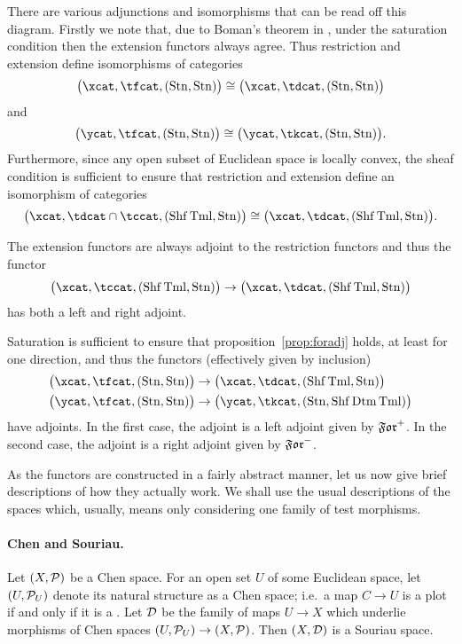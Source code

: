 \documentclass[%
12pt,%
arxiv,%
defaults
]{myclass}
\begin{document}
There are various adjunctions and isomorphisms that can be read off this diagram.
Firstly we note that, due to Boman's theorem in \cite{jb3}, under the saturation condition then the extension functors always agree.
Thus restriction and extension define isomorphisms of categories
%
\[
  \big(\xcat, \tfcat, (\Sat, \Sat)\big) \cong \big(\xcat, \tdcat,(\Sat,\Sat)\big)
\]
%
and
%
\[
  \big(\ycat, \tfcat, (\Sat, \Sat)\big) \cong \big(\ycat, \tkcat, (\Sat,\Sat)\big).
\]
%
Furthermore, since any open subset of Euclidean space is locally convex, the sheaf condition is sufficient to ensure that restriction and extension define an isomorphism of categories
%
\[
  \big(\xcat, \tdcat \cap \tccat, (\Sheaf \Term,\Sat)\big) \cong      \big(\xcat, \tdcat, (\Sheaf \Term,\Sat)\big).
\]

The extension functors are always adjoint to the restriction functors and thus the functor
%
\[
  \big(\xcat, \tccat, (\Sheaf \Term,\Sat)\big) \to \big(\xcat, \tdcat, (\Sheaf \Term,\Sat)\big)
\]
%
has both a left and right adjoint.

Saturation is sufficient to ensure that proposition~\ref{prop:foradj} holds, at least for one direction, and thus the functors (effectively given by inclusion)
%
\begin{align*}
  \big(\xcat, \tfcat, (\Sat, \Sat)\big) &\to \big(\xcat, \tdcat, (\Sheaf\Term, \Sat)\big) \\
%
  \big(\ycat, \tfcat, (\Sat, \Sat)\big) &\to \big(\ycat, \tkcat, (\Sat,\Sheaf\Detm\Term)\big)
\end{align*}
%
have adjoints.
In the first case, the adjoint is a left adjoint given by \(\Mforfunc\).
In the second case, the adjoint is a right adjoint given by \(\Jforfunc\).

As the functors are constructed in a fairly abstract manner, let us now give brief descriptions of how they actually work.
We shall use the usual descriptions of the spaces which, usually, means only considering one family of test morphisms.

\paragraph{Chen and Souriau.}

Let \((X, \mathcal{P})\) be a Chen space.
For an open set \(U\) of some Euclidean space, let \((U, \mathcal{P}_U)\) denote its natural structure as a Chen space; i.e.\ a map \(C \to U\) is a plot if and only if it is a \cimap.
Let \(\mathcal{D}\) be the family of maps \(U \to X\) which underlie morphisms of Chen spaces \((U, \mathcal{P}_U) \to (X, \mathcal{P})\).
Then \((X, \mathcal{D})\) is a Souriau space.
\end{document}
